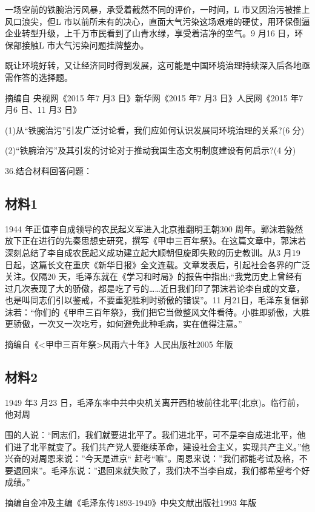 \documentclass[UTF8,11pt]{ctexart}
\begin{document}
一场空前的铁腕治污风暴，承受着截然不同的评价，一时间，L 市又因治污被推上风口浪尖，但L 市以前所未有的决心，直面大气污染这场艰难的硬仗，用环保倒逼企业转型升级，上千万市民看到了山青水绿，享受着洁净的空气。9 月16 日，环保部接触L 市大气污染问题挂牌整办。

既让环境好转，又让经济同时得到发展，这可能是中国环境治理持续深入后各地亟需作答的选择题。

摘编自 央视网《2015 年7 月3 日》新华网《2015 年7 月3 日》人民网《2015 年7 月6 日、11 月3 日》

(1)从“铁腕治污”引发广泛讨论看，我们应如何认识发展同环境治理的关系?(6 分)


(2)“铁腕治污”及其引发的讨论对于推动我国生态文明制度建设有何启示?(4 分)


36.结合材料回答问题：


\subsection*{材料1}

1944 年正值李自成领导的农民起义军进入北京推翻明王朝300 周年。郭沫若毅然放下正在进行的先秦思想史研究，撰写《甲申三百年祭》。在这篇文章中，郭沫若深刻总结了李自成农民起义成功建立起大顺朝但旋即失败的历史教训。从3 月19 日起，这篇长文在重庆《新华日报》全文连载。文章发表后，引起社会各界的广泛关注。仅隔20 天，毛泽东就在《学习和时局》的报告中指出;“我党历史上曾经有过几次表现了大的骄傲，都是吃了亏的……近日我们印了郭沫若论李自成的文章，也是叫同志们引以鉴戒，不要重犯胜利时骄傲的错误”。11 月21日，毛泽东复信郭沫若：“你们的《甲申三百年祭》，我们把它当做整风文件看待。小胜即骄傲，大胜更骄傲，一次又一次吃亏，如何避免此种毛病，实在值得注意。”

摘编自《<甲申三百年祭>风雨六十年》人民出版社2005 年版

\subsection*{材料2}

1949 年3 月23 日，毛泽东率中共中央机关离开西柏坡前往北平(北京)。临行前，他对周


围的人说：“同志们，我们就要进北平了。我们进北平，可不是李自成进北平，他们进了北平就变了。我们共产党人要继续革命，建设社会主义，实现共产主义。”他兴奋的对周恩来说：”今天是进京“ 赶考“嘛”。周恩来说：”我们都能考试及格，不要退回来”。毛泽东说：”退回来就失败了，我们决不当李自成，我们都希望考个好成绩。”

摘编自金冲及主编《毛泽东传1893-1949》中央文献出版社1993 年版
\end{document}
